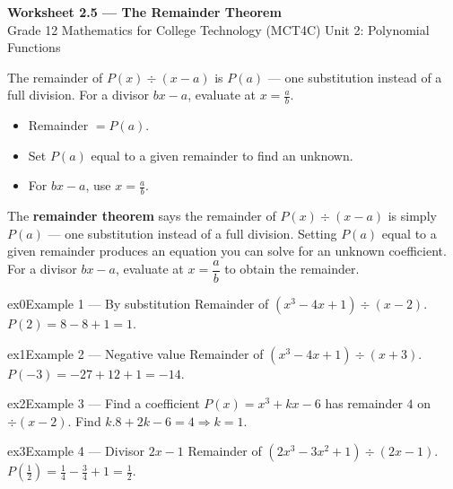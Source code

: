 \documentclass[11pt]{article}
\begin{document}
\begin{center}
{\LARGE\bfseries\color{titleblue}Worksheet 2.5 --- The Remainder Theorem}\\[2pt]
{\small Grade 12 Mathematics for College Technology (MCT4C) \textperiodcentered{} Unit 2: Polynomial Functions}
\end{center}

\begin{ideabox}
The remainder of $P(x)\div(x-a)$ is $P(a)$ — one substitution instead of a full division. For a divisor $bx-a$, evaluate at $x=\tfrac{a}{b}$.
\begin{itemize}[leftmargin=*,itemsep=2pt]
  \item Remainder $=P(a)$.
  \item Set $P(a)$ equal to a given remainder to find an unknown.
  \item For $bx-a$, use $x=\tfrac{a}{b}$.
\end{itemize}
\end{ideabox}

\begin{learnbox}
The \textbf{remainder theorem} says the remainder of $P(x)\div(x-a)$ is simply $P(a)$ — one substitution instead of a full division.
Setting $P(a)$ equal to a given remainder produces an equation you can solve for an unknown coefficient.
For a divisor $bx-a$, evaluate at $x=\dfrac{a}{b}$ to obtain the remainder.
\end{learnbox}


\begin{example}{ex0}{Example 1 --- By substitution}
Remainder of $(x^3-4x+1)\div(x-2)$.\soln $P(2)=8-8+1=1$.
\end{example}

\begin{example}{ex1}{Example 2 --- Negative value}
Remainder of $(x^3-4x+1)\div(x+3)$.\soln $P(-3)=-27+12+1=-14$.
\end{example}

\begin{example}{ex2}{Example 3 --- Find a coefficient}
$P(x)=x^3+kx-6$ has remainder $4$ on $\div(x-2)$. Find $k$.\soln $8+2k-6=4\Rightarrow k=1$.
\end{example}

\begin{example}{ex3}{Example 4 --- Divisor $2x-1$}
Remainder of $(2x^3-3x^2+1)\div(2x-1)$.\soln $P(\tfrac12)=\tfrac14-\tfrac34+1=\tfrac12$.
\end{example}
\end{document}
